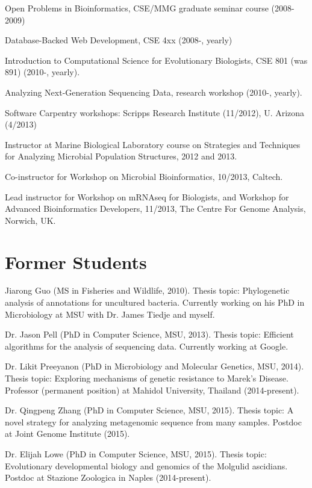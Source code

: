 \documentclass[margin,line]{resume}
\begin{document}
\begin{resume}
\begin{list1}
\item[] Open Problems in Bioinformatics, CSE/MMG graduate seminar
  course (2008-2009)
\item[] Database-Backed Web Development, CSE 4xx (2008-, yearly)
\item[] Introduction to Computational Science for Evolutionary Biologists, CSE 801 (was 891) (2010-, yearly).
\item[] Analyzing Next-Generation Sequencing Data, research workshop (2010-, yearly).
\item[] Software Carpentry workshops: Scripps Research Institute (11/2012), U. Arizona (4/2013)
\item[] Instructor at Marine Biological Laboratory course on Strategies and Techniques for Analyzing Microbial Population Structures, 2012 and 2013.
\item[] Co-instructor for Workshop on Microbial Bioinformatics, 10/2013, Caltech.
\item[] Lead instructor for Workshop on mRNAseq for Biologists, and Workshop for Advanced Bioinformatics Developers, 11/2013, The Centre For Genome Analysis, Norwich, UK.
\end{list1}

\section{\mysidestyle Former Students}

Jiarong Guo (MS in Fisheries and Wildlife, 2010).  Thesis topic:
Phylogenetic analysis of annotations for uncultured bacteria.
Currently working on his PhD in Microbiology at MSU with Dr. James
Tiedje and myself.

Dr. Jason Pell (PhD in Computer Science, MSU, 2013). Thesis topic:
Efficient algorithms for the analysis of sequencing data.  Currently
working at Google.

Dr. Likit Preeyanon (PhD in Microbiology and Molecular Genetics, MSU,
2014). Thesis topic: Exploring mechanisms of genetic resistance to
Marek's Disease.  Professor (permanent position) at Mahidol
University, Thailand (2014-present).

Dr. Qingpeng Zhang (PhD in Computer Science, MSU, 2015).  Thesis
topic: A novel strategy for analyzing metagenomic sequence from many
samples.  Postdoc at Joint Genome Institute (2015).

Dr. Elijah Lowe (PhD in Computer Science, MSU, 2015).  Thesis topic:
Evolutionary developmental biology and genomics of the Molgulid
ascidians.  Postdoc at Stazione Zoologica in Naples (2014-present).


\end{resume}
\end{document}
